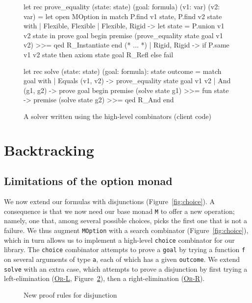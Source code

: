 \documentclass{easychair}
\def\li{\lstinline}
\let\TirName\textsc
\renewcommand{\DefTirName}[1]{\hyperlink{#1}{\TirName {#1}}}
\let\Rule\DefTirName
\newcommand{\fref}[1]{Figure~\ref{fig:#1}}
\begin{document}
\begin{figure}
  \centering
\begin{ocaml}
let rec prove_equality (state: state) (goal: formula) (v1: var) (v2: var) =
  let open MOption in
  match P.find v1 state, P.find v2 state with
  | Flexible, Flexible
  | Flexible, Rigid ->
      let state = P.union v1 v2 state in
      prove goal begin
        premise (prove_equality state goal v1 v2) >>=
        qed R_Instantiate
      end
  (* ... *)
  | Rigid, Rigid ->
      if P.same v1 v2 state then
        axiom state goal R_Refl
      else
        fail

let rec solve (state: state) (goal: formula): state outcome =
  match goal with
  | Equals (v1, v2) ->
      prove_equality state goal v1 v2
  | And (g1, g2) ->
      prove goal begin
        premise (solve state g1) >>= fun state ->
        premise (solve state g2) >>=
        qed R_And
      end
\end{ocaml}
  \caption{A solver written using the high-level combinators (client code)}
  \label{fig:solver2}
\end{figure}

\section{Backtracking}
\label{sec:backtracking}

\subsection{Limitations of the option monad}

We now extend our formulas with disjunctions (\fref{choice}). A consequence
is that we now need our base monad \li+M+ to offer a new operation; namely, one
that, among several possible choices, picks the first one that is not a failure.
We thus augment \li+MOption+ with a search combinator (\fref{choice}), which in
turn allows us to implement a high-level \li+choice+ combinator for our
library. The \li+choice+ combinator attempts to prove a \li+goal+ by trying a
function \li+f+ on several arguments of type \li+a+, each of which
has a given \li+outcome+. We extend \li+solve+ with an extra case,
which attempts to prove a disjunction by first trying a
left-elimination (\Rule{Or-L}, \fref{proof-system2}), then a right-elimination
(\Rule{Or-R}).

\begin{figure}
  \centering
  \begin{mathpar}

  \end{mathpar}
  \caption{New proof rules for disjunction}
  \label{fig:proof-system2}
\end{figure}
\end{document}
